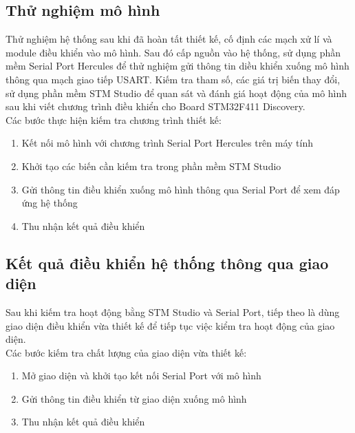\documentclass[a4paper, 12pt]{article}
\begin{document}
	\subsection{Thử nghiệm mô hình}
	\hspace{0.5cm}
	Thử nghiệm hệ thống sau khi đã hoàn tất thiết kế, cố định các mạch xử lí và module điều khiển vào mô hình. Sau đó cấp nguồn vào hệ thống, sử dụng phần mềm Serial Port Hercules để thử nghiệm gửi thông tin diều khiển xuống mô hình thông qua mạch giao tiếp USART. Kiếm tra tham số, các giá trị biến thay đổi, sử dụng phần mềm STM Studio để quan sát và đánh giá hoạt động của mô hình sau khi viết chương trình điều khiển cho Board STM32F411 Discovery.\\\indent
	Các bước thực hiện kiếm tra chương trình thiết kế:\\
	\begin{enumerate}
		\item Kết nối mô hình với chương trình Serial Port Hercules trên máy tính
		
		\item Khởi tạo các biến cần kiếm tra trong phần mềm STM Studio
		
		\item Gửi thông tin điều khiển xuống mô hình thông qua Serial Port để xem đáp ứng hệ thống
		
		\item Thu nhận kết quả điều khiển
		
	\end{enumerate}
	\newpage
	\subsection{Kết quả điều khiển hệ thống thông qua giao diện}
	\hspace{0.5cm}
	Sau khi kiếm tra hoạt động bằng STM Studio và Serial Port, tiếp theo là dùng giao diện điều khiển vừa thiết kế để tiếp tục việc kiểm tra hoạt động của giao diện.\\\indent
	Các bước kiếm tra chất lượng của giao diện vừa thiết kế:\\
	\begin{enumerate}
		\item Mở giao diện và khởi tạo kết nối Serial Port với mô hình
		
		\item Gửi thông tin điều khiển từ giao diện xuống mô hình
		
		\item Thu nhận kết quả điều khiển
	\end{enumerate}
\end{document}
